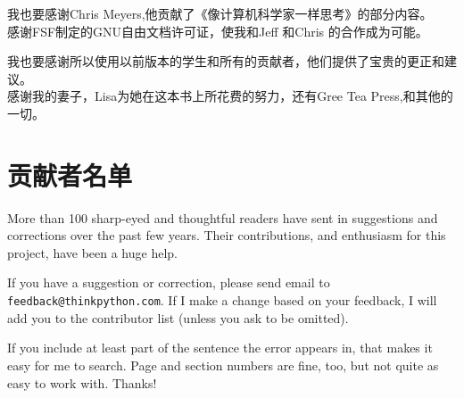 \documentclass[10pt]{book}
\begin{document}
我也要感谢Chris Meyers,他贡献了《像计算机科学家一样思考》的部分内容。\\

感谢FSF制定的GNU自由文档许可证，使我和Jeff 和Chris 的合作成为可能。\\


我也要感谢所以使用以前版本的学生和所有的贡献者，他们提供了宝贵的更正和建议。\\

感谢我的妻子，Lisa为她在这本书上所花费的努力，还有Gree Tea Press,和其他的一切。

\section*{贡献者名单}


More than 100 sharp-eyed and thoughtful readers have sent in
suggestions and corrections over the past few years.  Their
contributions, and enthusiasm for this project, have been a
huge help.

If you have a suggestion or correction, please send email to 
{\tt feedback@thinkpython.com}.  If I make a change based on your
feedback, I will add you to the contributor list
(unless you ask to be omitted).

If you include at least part of the sentence the
error appears in, that makes it easy for me to search.  Page and
section numbers are fine, too, but not quite as easy to work with.
Thanks!

\small
\end{document}
